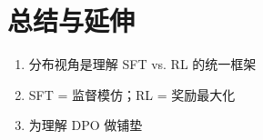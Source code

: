 \section{总结与延伸}
\begin{enumerate}
  \item 分布视角是理解 SFT vs. RL 的统一框架
  \item SFT = 监督模仿；RL = 奖励最大化
  \item 为理解 DPO 做铺垫
\end{enumerate}

